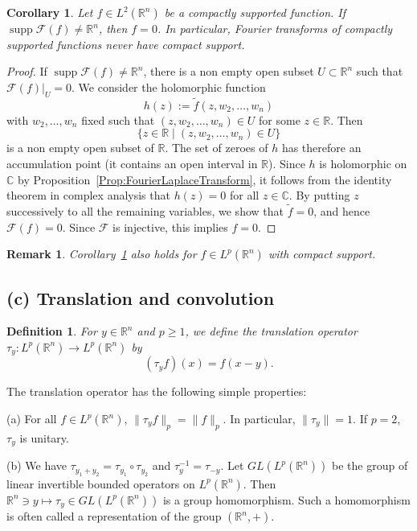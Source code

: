 \documentclass[12pt, oneside, a4paper]{article}
\newtheorem{cor}[thm]{Corollary}
\def\supp{\operatorname{supp}}
\theoremstyle{dfn}
\newtheorem{dfn}[thm]{Definition}
\newtheorem{rem}[thm]{Remark}
\def\Rbb{\ensuremath{\mathbb{R}}}
\providecommand{\norm}[1]{\lVert#1\rVert}
\newcommand{\Fcal}{\mathcal{F}}
\newcommand{\Com}{\mathbb{C}}
\begin{document}
\begin{cor}\label{Cor:FourierTransformSupport}
Let $f \in L^2(\Rbb^n)$ be a compactly supported function. If $\supp \Fcal(f) \neq \Rbb^n$, then $f = 0$.
In particular, Fourier transforms of compactly supported functions never have compact support.
\end{cor}

\begin{proof}
If $\supp \Fcal(f) \neq \Rbb^n$, there is a non empty open subset $U \subset \Rbb^n$ such that $\Fcal(f)|_U = 0$. We consider the holomorphic function
\[
h(z) := \widetilde{f}(z,w_2,\dots,w_n)
\]
with $w_2,\dots,w_n$ fixed such that $(z,w_2,\dots,w_n) \in U$ for some $z \in \Rbb$. Then
\[
\{z \in \Rbb \mid (z,w_2,\dots,w_n) \in U\}
\]
is a non empty open subset of $\Rbb$. The set of zeroes of $h$ has therefore an accumulation point (it contains an open interval in $\Rbb$). Since $h$ is holomorphic on $\Com$ by Proposition~\ref{Prop:FourierLaplaceTransform}, it follows from the identity theorem in complex analysis that $h(z) = 0$ for all $z \in \Com$. By putting $z$ successively to all the remaining variables, we show that $\widetilde{f} = 0$, and hence $\Fcal(f) = 0$. Since $\Fcal$ is injective, this implies $f = 0$.
\end{proof}

\begin{rem}
Corollary~\ref{Cor:FourierTransformSupport} also holds for $f \in L^p(\Rbb^n)$ with compact support.
\end{rem}

\subsection*{(c) Translation and convolution}

\begin{dfn}
For $y \in \Rbb^n$ and $p \geqslant 1$, we define the translation operator $\tau_y \colon L^p(\Rbb^n) \to L^p(\Rbb^n)$ by
\[
(\tau_y f)(x) = f(x-y).
\]
\end{dfn}

The translation operator has the following simple properties:

(a) For all $f \in L^p(\Rbb^n)$, $\norm{\tau_y f}_p = \norm{f}_p$. In particular, $\norm{\tau_y} = 1$. If $p=2$, $\tau_y$ is unitary.

(b) We have $\tau_{y_1 + y_2} = \tau_{y_1} \circ \tau_{y_2}$ and $\tau_y^{-1} = \tau_{-y}$. Let $GL(L^p(\Rbb^n))$ be the group of linear invertible bounded operators on $L^p(\Rbb^n)$. Then $\Rbb^n \ni y \mapsto \tau_y \in GL(L^p(\Rbb^n))$ is a group homomorphism. Such a homomorphism is often called a representation of the group $(\Rbb^n,+)$.
\end{document}
